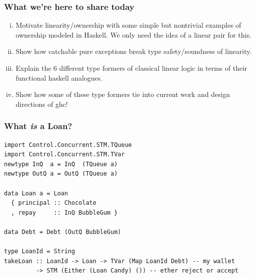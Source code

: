 \documentclass[11pt,reqno]{beamer}
\begin{document}
\begin{frame}\frametitle{What we're here to share today}
  \begin{enumerate}[(i)]
    \item Motivate linearity/ownership with some simple but nontrivial examples of ownership modeled
    in Haskell. We only need the idea of a linear pair for this.
    \item Show how catchable pure exceptions break type safety/soundness of linearity.
    \item Explain the 6 different type formers of classical linear logic in terms of
    their functional haskell analogues.
    \item Show how some of these type formers tie into current work and design directions
    of ghc!
  \end{enumerate}
\end{frame}













\begin{frame}[fragile]
\frametitle{What \emph{is} a Loan?}

\begin{verbatim}
import Control.Concurrent.STM.TQueue
import Control.Concurrent.STM.TVar
newtype InQ  a = InQ  (TQueue a)
newtype OutQ a = OutQ (TQueue a)

data Loan a = Loan
  { principal :: Chocolate
  , repay     :: InQ BubbleGum }

data Debt = Debt (OutQ BubbleGum)

type LoanId = String
takeLoan :: LoanId -> Loan -> TVar (Map LoanId Debt) -- my wallet
         -> STM (Either (Loan Candy) ()) -- ether reject or accept
\end{verbatim}
\end{frame}

\end{document}
